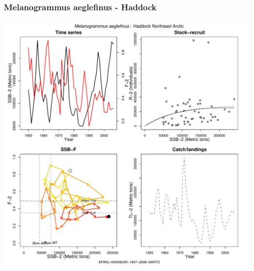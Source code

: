 \subsubsection{Melanogrammus aeglefinus - Haddock}
\begin{center}
\includegraphics[width=1.2\textwidth]{../R/figures/AFWG-HADNEAR-1947-2006-MINTO.pdf}
\end{center}

